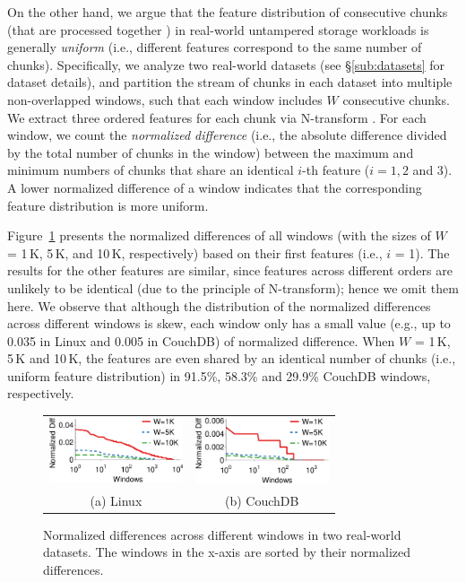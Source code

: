 On the other hand, we argue that the feature distribution of consecutive chunks (that are processed together \cite{zhu08}) in real-world untampered storage workloads is generally {\em uniform} (i.e., different features correspond to the same number of chunks).
Specifically, we analyze two real-world datasets (see \S\ref{sub:datasets} for dataset details), and partition the stream of chunks in each dataset into multiple non-overlapped windows, such that each window includes $W$ consecutive chunks. We extract three ordered features for each chunk via N-transform \cite{shilane12}. For each window, we count the {\em normalized difference} (i.e., the absolute difference divided by the total number of chunks in the window) between the maximum and minimum numbers of chunks that share an identical $i$-th feature ($i=1, 2$ and $3$). A lower normalized difference of a window indicates that the corresponding feature distribution is more uniform.


Figure~\ref{fig:featureDistribution} presents the normalized differences of all windows (with the sizes of $W$ = 1\,K, 5\,K, and 10\,K, respectively) based on their first features (i.e., $i$ = 1). The results for the other features are similar, since features across different orders are unlikely to be identical (due to the principle of N-transform); hence we omit them here.
We observe that although the distribution of the normalized differences across different windows is skew, each window only has a small value (e.g., up to 0.035 in Linux and 0.005 in CouchDB) of normalized difference. When $W$ = 1\,K, 5\,K and 10\,K, the features are even shared by an identical number of chunks (i.e., uniform feature distribution) in 91.5\%, 58.3\% and 29.9\% CouchDB windows, respectively.


\begin{figure}
  \centering
  \begin{tabular}{cc}
    \includegraphics[width=1.55in]{pic/featurespy/plot/featureDistribution/featureDistributionLinux.pdf} &
                                                                                            \includegraphics[width=1.55in]{pic/featurespy/plot/featureDistribution/featureDistributionCouchbase.pdf} \\
    {\small (a) Linux} & {\small (b) CouchDB} \\
    \end{tabular}
  \vspace{-6pt}
  \caption{Normalized differences across different windows in two real-world datasets. The windows in the x-axis are sorted by their normalized differences.}
  \label{fig:featureDistribution}
  \vspace{-6pt}
\end{figure}


